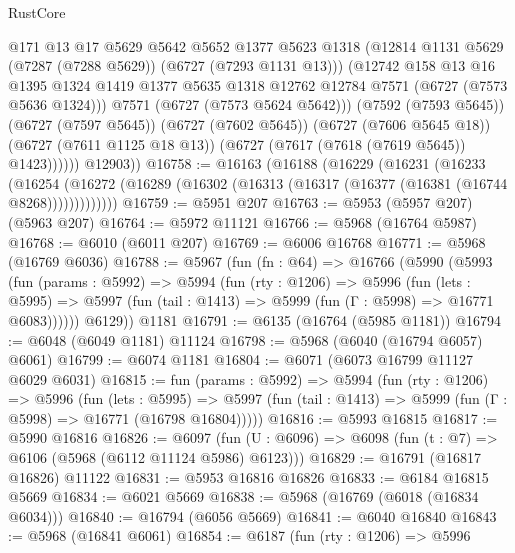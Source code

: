 \begin{lexlean}{RustCore}
\begin{coremodule}
                  @171
                  @13
                  @17
                  @5629
                  @5642
                  @5652
                  @1377
                  @5623
                  @1318
                  (@12814 @1131 @5629 (@7287 (@7288 @5629)) (@6727 (@7293 @1131 @13)))
                  (@12742
                    @158
                    @13
                    @16
                    @1395
                    @1324
                    @1419
                    @1377
                    @5635
                    @1318
                    @12762
                    @12784
                    @7571
                    (@6727 (@7573 @5636 @1324)))
                  @7571
                  (@6727 (@7573 @5624 @5642)))
                (@7592 (@7593 @5645))
                (@6727 (@7597 @5645))
                (@6727 (@7602 @5645))
                (@6727 (@7606 @5645 @18))
                (@6727 (@7611 @1125 @18 @13))
                (@6727 (@7617 (@7618 (@7619 @5645)) @1423))))))
        @12903))
@16758 := @16163
    (@16188
      (@16229
        (@16231
          (@16233
            (@16254
              (@16272 (@16289 (@16302 (@16313 (@16317 (@16377 (@16381 (@16744 @8268)))))))))))))
@16759 := @5951 @207
@16763 := @5953 (@5957 @207) (@5963 @207)
@16764 := @5972 @11121
@16766 := @5968 (@16764 @5987)
@16768 := @6010 (@6011 @207)
@16769 := @6006 @16768
@16771 := @5968 (@16769 @6036)
@16788 := @5967
    (fun (fn : @64) =>
    @16766
      (@5990
        (@5993
          (fun (params : @5992) =>
          @5994
            (fun (rty : @1206) =>
            @5996
              (fun (lets : @5995) =>
              @5997 (fun (tail : @1413) => @5999 (fun (Γ : @5998) => @16771 @6083))))))
        @6129))
    @1181
@16791 := @6135 (@16764 (@5985 @1181))
@16794 := @6048 (@6049 @1181) @11124
@16798 := @5968 (@6040 (@16794 @6057) @6061)
@16799 := @6074 @1181
@16804 := @6071 (@6073 @16799 @11127 @6029 @6031)
@16815 := fun (params : @5992) =>
  @5994
    (fun (rty : @1206) =>
    @5996
      (fun (lets : @5995) =>
      @5997 (fun (tail : @1413) => @5999 (fun (Γ : @5998) => @16771 (@16798 @16804)))))
@16816 := @5993 @16815
@16817 := @5990 @16816
@16826 := @6097
    (fun (U : @6096) => @6098 (fun (t : @7) => @6106 (@5968 (@6112 @11124 @5986) @6123)))
@16829 := @16791 (@16817 @16826) @11122
@16831 := @5953 @16816 @16826
@16833 := @6184 @16815 @5669
@16834 := @6021 @5669
@16838 := @5968 (@16769 (@6018 (@16834 @6034)))
@16840 := @16794 (@6056 @5669)
@16841 := @6040 @16840
@16843 := @5968 (@16841 @6061)
@16854 := @6187
    (fun (rty : @1206) =>
    @5996

\end{coremodule}
\end{lexlean}
